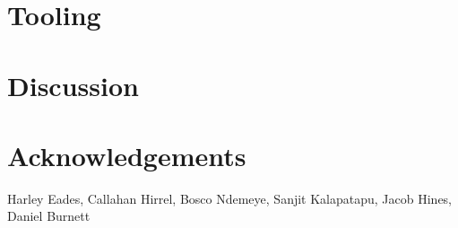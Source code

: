 \documentclass[submission,copyright,creativecommons]{eptcs}
\begin{document}
\section{Tooling}
\label{sec:tools}

\section{Discussion}
\label{sec:discussion}


\section{Acknowledgements}
\label{sec:acks}

Harley Eades, Callahan Hirrel, Bosco Ndemeye, Sanjit Kalapatapu, Jacob
Hines, Daniel Burnett

\end{document}
